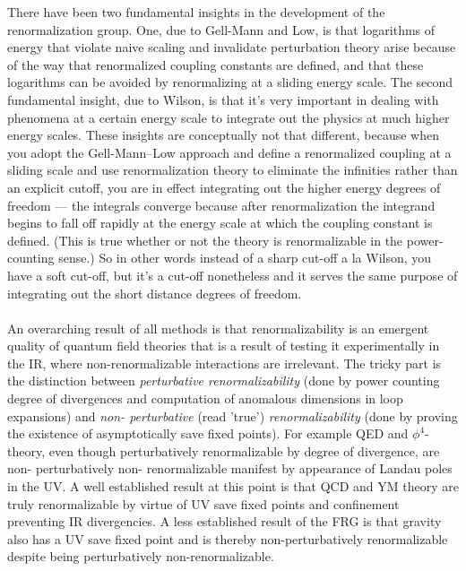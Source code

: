 There have been two fundamental insights in the development of
the renormalization group. One, due to Gell-Mann and Low, is
that logarithms of energy that violate naive scaling and invalidate perturbation theory arise because of the way that renormalized coupling constants are defined, and that these logarithms
can be avoided by renormalizing at a sliding energy scale. The
second fundamental insight, due to Wilson, is that it’s very important in dealing with phenomena at a certain energy scale to
integrate out the physics at much higher energy scales. These insights are conceptually not that different, because when you adopt the
Gell-Mann–Low approach and define a renormalized coupling
at a sliding scale and use renormalization theory to eliminate
the infinities rather than an explicit cutoff, you are in effect integrating out the higher energy degrees of freedom — the integrals
converge because after renormalization the integrand begins to
fall off rapidly at the energy scale at which the coupling constant
is defined. (This is true whether or not the theory is renormalizable in the power-counting sense.) So in other words instead of
a sharp cut-off a la Wilson, you have a soft cut-off, but it’s a cut-off
nonetheless and it serves the same purpose of integrating out the
short distance degrees of freedom.
\\
\\
An overarching result of all methods is that renormalizability is an emergent quality of quantum field theories that is a result of testing it experimentally in the IR, where non-renormalizable interactions are irrelevant. The tricky part is the distinction between \emph{perturbative renormalizability} (done by power counting degree of divergences and computation of anomalous dimensions in loop expansions) and \emph{non- perturbative} (read ’true’) \emph{renormalizability} (done by proving the existence of asymptotically save fixed points). For example QED and $\phi^4$-theory, even though perturbatively renormalizable by degree of divergence, are non- perturbatively non- renormalizable manifest by appearance of Landau poles in the UV. A well established result at this point is that QCD and YM theory are truly renormalizable by virtue of UV save fixed points and confinement preventing IR divergencies. A less established result of the FRG is that gravity also has a UV save fixed point and is thereby non-perturbatively renormalizable despite being perturbatively non-renormalizable.


